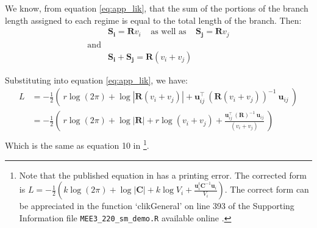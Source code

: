 \begin{enumerate}
We know, from equation \ref{eq:app_lik}, that the sum of the portions of the branch length assigned to each regime is equal to the total length of the branch. Then:
\begin{equation*}
\begin{split}
& \mathbf{S_{i}} = \mathbf{R} v_{i} \: \: \: \: \: \text{as well as} \: \: \: \: \: \mathbf{S_{j}} = \mathbf{R} v_{j} \\
\text{and} &\\
& \mathbf{S_{i}} + \mathbf{S_{j}} = \mathbf{R} ( v_{i} + v_{j} )
\end{split}
\end{equation*}

Substituting into equation \ref{eq:app_lik}, we have:
\begin{equation} \label{eq:app_lik_proof}
\begin{split}
L &= - \frac{1}{2} \left( \: r \log(2 \pi) + \log | \mathbf{R} ( v_{i} + v_{j} )  | + \mathbf{u}_{ij}^\intercal \: (\mathbf{R} ( v_{i} + v_{j} ))^{-1} \:  \mathbf{u}_{ij} \: \right)  \\
&= - \frac{1}{2} \left( \: r \log(2 \pi) + \log | \mathbf{R} | + r \log( v_{i} + v_{j} ) + \frac{\mathbf{u}_{ij}^\intercal \: (\mathbf{R})^{-1} \:  \mathbf{u}_{ij}}{( v_{i} + v_{j} )} \: \right)  \\
\end{split}
\end{equation}
Which is the same as equation 10 in \citet{freckleton_fast_2012}\footnote{Note that the published equation in \citet{freckleton_fast_2012} has a printing error. The corrected form is \linebreak $ L = - \frac{1}{2} \left( k \log(2\pi) + \log | \mathbf{C} | + k \log \mathit{V}_{i} + \frac{\mathbf{u}_{i}^{t} \mathbf{C}^{-1} \mathbf{u}_{i}}{\mathit{V}_{i}} \right) $. The correct form can be appreciated in the function `clikGeneral' on line 393 of the Supporting Information file \texttt{MEE3\_220\_sm\_demo.R} available online \citep{freckleton_fast_2012}.}.


\end{enumerate}
